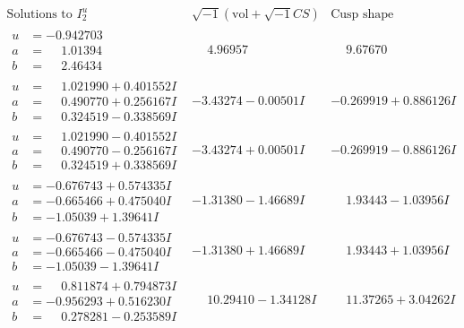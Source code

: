 \documentclass[1p]{elsarticle_modified}
\theoremstyle{definition}
\newcommand{\I}{\sqrt{-1}}
\begin{document}
$$\begin{array}{c|c|c}  
\text{Solutions to }I^u_{2}& \I (\text{vol} + \sqrt{-1}CS) & \text{Cusp shape}\\
 \hline 
\begin{aligned}
u &= -0.942703\phantom{ +0.000000I} \\
a &= \phantom{-}1.01394\phantom{ +0.000000I} \\
b &= \phantom{-}2.46434\phantom{ +0.000000I}\end{aligned}
 & \phantom{-}4.96957\phantom{ +0.000000I} & \phantom{-}9.67670\phantom{ +0.000000I} \\ \hline\begin{aligned}
u &= \phantom{-}1.021990 + 0.401552 I \\
a &= \phantom{-}0.490770 + 0.256167 I \\
b &= \phantom{-}0.324519 - 0.338569 I\end{aligned}
 & -3.43274 - 0.00501 I & -0.269919 + 0.886126 I \\ \hline\begin{aligned}
u &= \phantom{-}1.021990 - 0.401552 I \\
a &= \phantom{-}0.490770 - 0.256167 I \\
b &= \phantom{-}0.324519 + 0.338569 I\end{aligned}
 & -3.43274 + 0.00501 I & -0.269919 - 0.886126 I \\ \hline\begin{aligned}
u &= -0.676743 + 0.574335 I \\
a &= -0.665466 + 0.475040 I \\
b &= -1.05039 + 1.39641 I\end{aligned}
 & -1.31380 - 1.46689 I & \phantom{-}1.93443 - 1.03956 I \\ \hline\begin{aligned}
u &= -0.676743 - 0.574335 I \\
a &= -0.665466 - 0.475040 I \\
b &= -1.05039 - 1.39641 I\end{aligned}
 & -1.31380 + 1.46689 I & \phantom{-}1.93443 + 1.03956 I \\ \hline\begin{aligned}
u &= \phantom{-}0.811874 + 0.794873 I \\
a &= -0.956293 + 0.516230 I \\
b &= \phantom{-}0.278281 - 0.253589 I\end{aligned}
 & \phantom{-}10.29410 - 1.34128 I & \phantom{-}11.37265 + 3.04262 I \\ \hline\begin{aligned}

\end{aligned}
\end{array}$$
\end{document}
